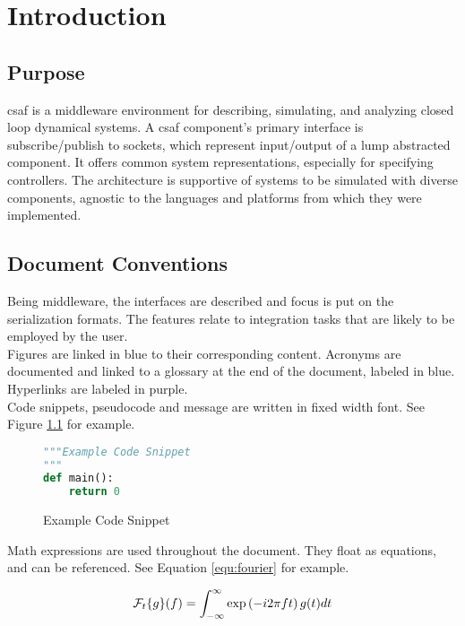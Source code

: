 \chapter{Introduction}

\section{Purpose}
\acrshort{csaf} is a middleware environment for describing, simulating, and analyzing closed loop dynamical systems. A \acrshort{csaf} component's primary interface is subscribe/publish to sockets, which represent input/output of a lump abstracted component. It offers common system representations, especially for specifying controllers. The architecture is supportive of systems to be simulated with diverse components, agnostic to the languages and platforms from which they were implemented.


\section{Document Conventions}

Being middleware, the interfaces are described and focus is put on the serialization formats. The features relate to integration tasks that are likely to be employed by the user. \\

Figures are linked in blue to their corresponding content. Acronyms are documented and linked to a glossary at the end of the document, labeled in blue. Hyperlinks are labeled in purple. \\

Code snippets, pseudocode and message are written in fixed width font. See Figure \ref{code:example} for example.

\begin{figure}[h]
\centering
\begin{lstlisting}[language=Python]
"""Example Code Snippet
"""
def main():
	return 0
\end{lstlisting}
\caption{Example Code Snippet}
\label{code:example}
\end{figure}

Math expressions are used throughout the document. They float as equations, and can be referenced. See Equation \ref{equ:fourier} for example.

\begin{equation} \label{equ:fourier}
\mathcal{F}_t\{g\}(f) = \int_{-\infty}^{\infty} \exp\left({-i 2\pi f t}\right) g(t) dt \\
\end{equation}


